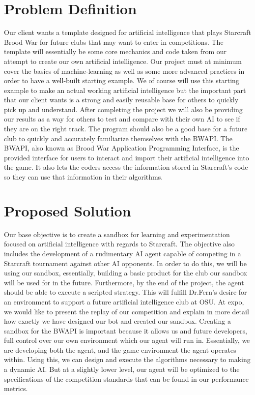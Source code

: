 \documentclass[10pt,letterpaper,onecolumn,draftclsnofoot]{IEEEtran}
\begin{document}
\section{Problem Definition}
Our client wants a template designed for artificial intelligence that plays Starcraft Brood War for future clubs that may want to enter in competitions. The template will essentially be some core mechanics and code taken from our attempt to create our own artificial intelligence. Our project must at minimum cover the basics of machine-learning as well as some more advanced practices in order to have a well-built starting example. We of course will use this starting example to make an actual working artificial intelligence but the important part that our client wants is a strong and easily reusable base for others to quickly pick up and understand. After completing the project we will also be providing our results as a way for others to test and compare with their own AI to see if they are on the right track. The program should also be a good base for a future club to quickly and accurately familiarize themselves with the BWAPI. The BWAPI, also known as Brood War Application Programming Interface, is the provided interface for users to interact and import their artificial intelligence into the game. It also lets the coders access the information stored in Starcraft’s code so they can use that information in their algorithms.

\section{Proposed Solution}
Our base objective is to create a sandbox for learning and experimentation focused on artificial intelligence with regards to Starcraft. The objective also includes the development of a rudimentary AI agent capable of competing in a Starcraft tournament against other AI opponents. In order to do this, we will be using our sandbox, essentially, building a basic product for the club our sandbox will be used for in the future. Furthermore, by the end of the project, the agent should be able to execute a scripted strategy. This will fulfill Dr.Fern’s desire for an environment to support a future artificial intelligence club at OSU. At expo, we would like to present the replay of our competition and explain in more detail how exactly we have designed our bot and created our sandbox.
Creating a sandbox for the BWAPI is important because it allows us and future developers, full control over our own environment which our agent will run in. Essentially, we are developing both the agent, and the game environment the agent operates within. Using this, we can design and execute the algorithms necessary to making a dynamic AI. But at a slightly lower level, our agent will be optimized to the specifications of the competition standards that can be found in our performance metrics. 
\end{document}
